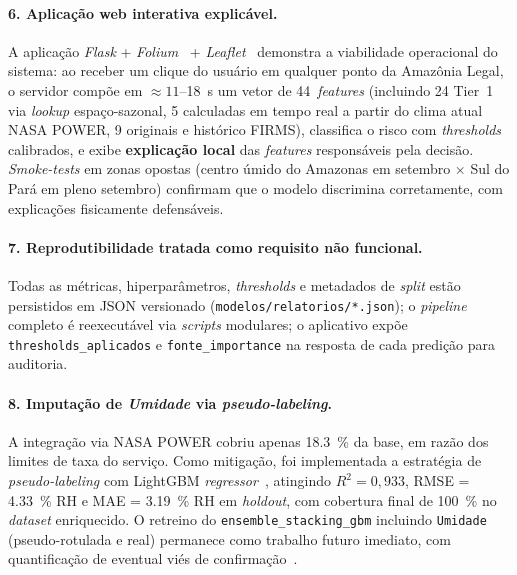 \paragraph{6. Aplicação web interativa explicável.} A aplicação \emph{Flask} + \emph{Folium}~\cite{folium} + \emph{Leaflet}~\cite{leafletjs} demonstra a viabilidade operacional do sistema: ao receber um clique do usuário em qualquer ponto da Amazônia Legal, o servidor compõe em \(\approx 11\)--\SI{18}{\second} um vetor de 44~\emph{features} (incluindo 24 Tier~1 via \emph{lookup} espaço-sazonal, 5 calculadas em tempo real a partir do clima atual NASA POWER, 9 originais e histórico FIRMS), classifica o risco com \emph{thresholds} calibrados, e exibe \textbf{explicação local} das \emph{features} responsáveis pela decisão. \emph{Smoke-tests} em zonas opostas (centro úmido do Amazonas em setembro \(\times\) Sul do Pará em pleno setembro) confirmam que o modelo discrimina corretamente, com explicações fisicamente defensáveis.

\paragraph{7. Reprodutibilidade tratada como requisito não funcional.} Todas as métricas, hiperparâmetros, \emph{thresholds} e metadados de \emph{split} estão persistidos em JSON versionado (\texttt{modelos/relatorios/*.json}); o \emph{pipeline} completo é reexecutável via \emph{scripts} modulares; o aplicativo expõe \texttt{thresholds\_aplicados} e \texttt{fonte\_importance} na resposta de cada predição para auditoria.

\paragraph{8. Imputação de \emph{Umidade} via \emph{pseudo-labeling}.} A integração via NASA POWER cobriu apenas \SI{18,3}{\percent} da base, em razão dos limites de taxa do serviço. Como mitigação, foi implementada a estratégia de \emph{pseudo-labeling} com LightGBM \emph{regressor}~\cite{lee2013pseudo,lopezgarcia2024spatiotemporal}, atingindo \(R^2 = 0{,}933\), RMSE = \SI{4,33}{\percent} RH e MAE = \SI{3,19}{\percent} RH em \emph{holdout}, com cobertura final de \SI{100}{\percent} no \emph{dataset} enriquecido. O retreino do \texttt{ensemble\_stacking\_gbm} incluindo \texttt{Umidade} (pseudo-rotulada e real) permanece como trabalho futuro imediato, com quantificação de eventual viés de confirmação~\cite{arazo2020pseudo}.

